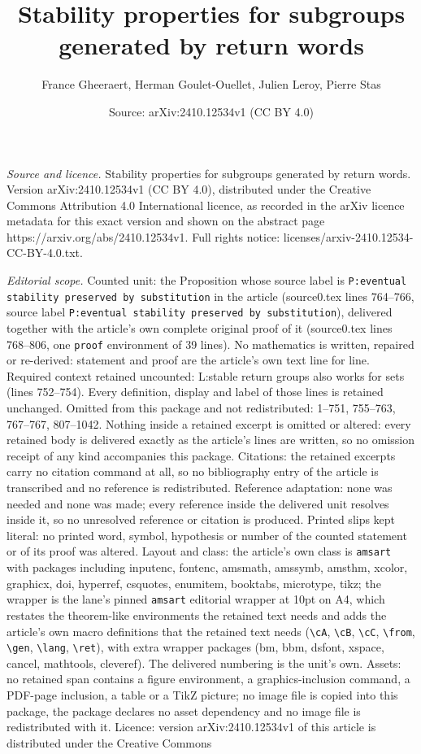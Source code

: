 \documentclass[10pt,a4paper]{amsart}
\title[Stability properties for subgroups generated by return words]{Stability properties for subgroups generated by return words}
\author{France Gheeraert, Herman Goulet-Ouellet, Julien Leroy, Pierre Stas}
\date{Source: arXiv:2410.12534v1 (CC BY 4.0)}
\begin{document}
\maketitle

\noindent\emph{Source and licence.} Stability properties for subgroups generated by return words. Version arXiv:2410.12534v1 (CC BY 4.0), distributed under the Creative Commons Attribution 4.0 International licence, as recorded in the arXiv licence metadata for this exact version and shown on the abstract page https://arxiv.org/abs/2410.12534v1. Full rights notice: licenses/arxiv-2410.12534-CC-BY-4.0.txt.\par\smallskip

\noindent\textit{Editorial scope.} Counted unit: the Proposition whose source label is \texttt{P:eventual stability preserved by substitution} in the article (source0.tex lines 764--766, source label \texttt{P:eventual stability preserved by substitution}), delivered together with the article's own complete original proof of it (source0.tex lines 768--806, one \texttt{proof} environment of 39 lines). No mathematics is written, repaired or re-derived: statement and proof are the article's own text line for line. Required context retained uncounted: L:stable return groups also works for sets (lines 752--754). Every definition, display and label of those lines is retained unchanged. Omitted from this package and not redistributed: 1--751, 755--763, 767--767, 807--1042. Nothing inside a retained excerpt is omitted or altered: every retained body is delivered exactly as the article's lines are written, so no omission receipt of any kind accompanies this package. Citations: the retained excerpts carry no citation command at all, so no bibliography entry of the article is transcribed and no reference is redistributed. Reference adaptation: none was needed and none was made; every reference inside the delivered unit resolves inside it, so no unresolved reference or citation is produced. Printed slips kept literal: no printed word, symbol, hypothesis or number of the counted statement or of its proof was altered. Layout and class: the article's own class is \texttt{amsart} with packages including inputenc, fontenc, amsmath, amssymb, amsthm, xcolor, graphicx, doi, hyperref, csquotes, enumitem, booktabs, microtype, tikz; the wrapper is the lane's pinned \texttt{amsart} editorial wrapper at 10pt on A4, which restates the theorem-like environments the retained text needs and adds the article's own macro definitions that the retained text needs (\texttt{\textbackslash cA}, \texttt{\textbackslash cB}, \texttt{\textbackslash cC}, \texttt{\textbackslash from}, \texttt{\textbackslash gen}, \texttt{\textbackslash lang}, \texttt{\textbackslash ret}), with extra wrapper packages (bm, bbm, dsfont, xspace, cancel, mathtools, cleveref). The delivered numbering is the unit's own. Assets: no retained span contains a figure environment, a graphics-inclusion command, a PDF-page inclusion, a table or a TikZ picture; no image file is copied into this package, the package declares no asset dependency and no image file is redistributed with it. Licence: version arXiv:2410.12534v1 of this article is distributed under the Creative Commons 
\end{document}
